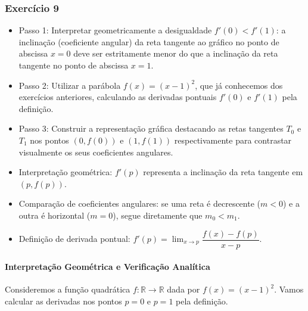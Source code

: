 \vspace{0.6cm}
\subsubsection*{Exercício 9}

\begin{estrategiabox}
  \begin{itemize}[noitemsep, topsep=2pt]
    \item Passo 1: Interpretar geometricamente a desigualdade $f'(0) < f'(1)$: a inclinação (coeficiente angular) da reta tangente ao gráfico no ponto de abscissa $x = 0$ deve ser estritamente menor do que a inclinação da reta tangente no ponto de abscissa $x = 1$.
    \item Passo 2: Utilizar a parábola $f(x) = (x - 1)^2$, que já conhecemos dos exercícios anteriores, calculando as derivadas pontuais $f'(0)$ e $f'(1)$ pela definição.
    \item Passo 3: Construir a representação gráfica destacando as retas tangentes $T_0$ e $T_1$ nos pontos $(0, f(0))$ e $(1, f(1))$ respectivamente para contrastar visualmente os seus coeficientes angulares.
  \end{itemize}
\end{estrategiabox}

\begin{recursosbox}
  \begin{itemize}[noitemsep, topsep=2pt]
    \item Interpretação geométrica: $f'(p)$ representa a inclinação da reta tangente em $(p, f(p))$.
    \item Comparação de coeficientes angulares: se uma reta é decrescente ($m < 0$) e a outra é horizontal ($m = 0$), segue diretamente que $m_0 < m_1$.
    \item Definição de derivada pontual: $f'(p) = \lim_{x \to p} \dfrac{f(x) - f(p)}{x - p}$.
  \end{itemize}
\end{recursosbox}

\paragraph{Interpretação Geométrica e Verificação Analítica}

Consideremos a função quadrática $f: \mathbb{R} \to \mathbb{R}$ dada por $f(x) = (x - 1)^2$.
Vamos calcular as derivadas nos pontos $p = 0$ e $p = 1$ pela definição.

